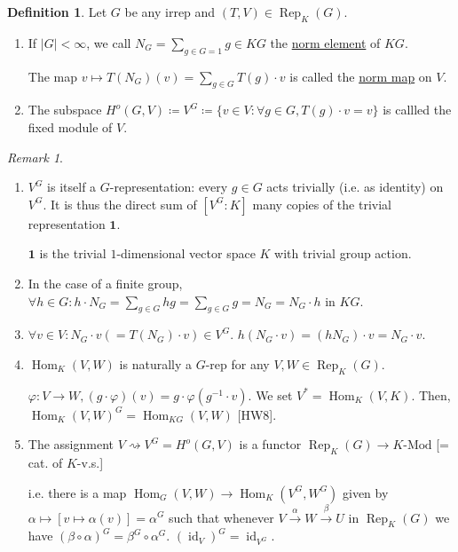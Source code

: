 \documentclass{article}
\theoremstyle{definition}
\newtheorem*{definition}{Definition}
\theoremstyle{plain}
\theoremstyle{remark}
\newtheorem*{remark*}{Remark}
\begin{document}
    \begin{definition}
        Let \(G\) be any irrep and \((T,V) \in \operatorname{Rep}_K(G)\).

        \begin{enumerate}[label=\roman*)]
            \item If \(\vert G \vert < \infty\), we call \(N_G = \sum_{g\in G=1} g \in KG\) the \underline{norm element} of \(KG\).
            
            The map \(v \mapsto T(N_G)(v) = \sum_{g\in G} T(g) \cdot v\) is called the \underline{norm map} on \(V\).
            
            \item The subspace \(H^o(G,V) \coloneqq V^G \coloneqq \{ v\in V : \forall g\in G, T(g) \cdot v = v \}\) is callled the fixed module of \(V\).
        \end{enumerate} 
    \end{definition}

    \begin{remark*}

        \begin{enumerate}[label=\arabic*)]
            \item \(V^G\) is itself a \(G\)-representation: every \(g\in G\) acts trivially (i.e. as identity) on \(V^G\). It is thus the direct sum of \([V^G : K]\) many copies of the trivial representation \(\mathbf{1}\).
            
            \(\mathbf{1}\) is the trivial \(1\)-dimensional vector space \(K\) with trivial group action.
            
            \item In the case of a finite group, \(\forall h\in G : h \cdot N_G = \sum_{g\in G} hg = \sum_{g\in G} g = N_G = N_G \cdot h\) in \(KG\).
            
            \item \(\forall v\in V: N_G \cdot v (= T(N_G) \cdot v) \in V^G\). \(h(N_G \cdot v) = (hN_G) \cdot v = N_G \cdot v\).
            \item \(\operatorname{Hom}_K(V,W)\) is naturally a \(G\)-rep for any \(V,W \in \operatorname{Rep}_K(G)\).
            
            \(\varphi : V \to W, (g \cdot \varphi)(v) = g \cdot \varphi (g ^{-1} \cdot v)\). We set \(V^{\ast} = \operatorname{Hom}_K(V,K)\). Then, \(\operatorname{Hom}_K(V,W)^G = \operatorname{Hom}_{KG}(V,W)\) [HW8].
            
            \item The assignment \(V \rightsquigarrow V^G = H^o(G,V)\) is a functor \(\operatorname{Rep}_K(G) \to K\text{-Mod}\) [= cat. of \(K\)-v.s.]
            
            i.e. there is a map \(\operatorname{Hom}_G(V,W) \to \operatorname{Hom}_K(V^G , W^G)\) given by \(\alpha \mapsto [v \mapsto \alpha(v)] = \alpha^G\) such that whenever \(V \xrightarrow{\alpha} W \xrightarrow{\beta} U\) in \(\operatorname{Rep}_K(G)\) we have \((\beta \circ \alpha)^G = \beta^G \circ \alpha^G\). \((\operatorname{id}_V)^G = \operatorname{id}_{V^G}\).  
        \end{enumerate} 
    \end{remark*}
\end{document}
